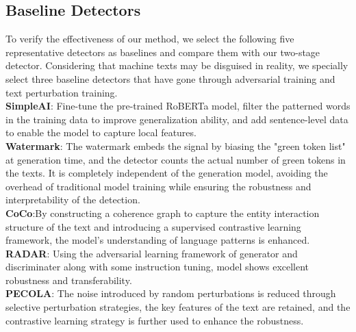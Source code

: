 \documentclass[11pt]{article}
\newcommand{\greenCitep}[1]{\textcolor{darkgreen}{\citep{#1}}}
\begin{document}
	\subsection{Baseline Detectors}
	\label{sec:baseline}
	To verify the effectiveness of our method, we select the following five representative detectors as baselines and compare them with our two-stage detector. Considering that machine texts may be disguised in reality, we specially select three baseline detectors that have gone through adversarial training and text perturbation training.\\
	\textbf{SimpleAI}\greenCitep{guo2023simpleai}: Fine-tune the pre-trained RoBERTa model, filter the patterned words in the training data to improve generalization ability, and add sentence-level data to enable the model to capture local features.\\
	\textbf{Watermark}\greenCitep{kirchenbauer2023watermark}: The watermark embeds the signal by biasing the "green token list" at generation time, and the detector counts the actual number of green tokens in the texts. It is completely independent of the generation model, avoiding the overhead of traditional model training while ensuring the robustness and interpretability of the detection.\\
	\textbf{CoCo}\greenCitep{liu2023coco}:By constructing a coherence graph to capture the entity interaction structure of the text and introducing a supervised contrastive learning framework, the model's understanding of language patterns is enhanced.\\
	\textbf{RADAR}\greenCitep{hu2023radarrobustaitextdetection}: Using the adversarial learning framework of generator and discriminater along with some instruction tuning, model shows excellent robustness and transferability.\\
	\textbf{PECOLA}\greenCitep{liu2024pecola}: The noise introduced by random perturbations is reduced through selective perturbation strategies, the key features of the text are retained, and the contrastive learning strategy is further used to enhance the robustness.\\
\end{document}
